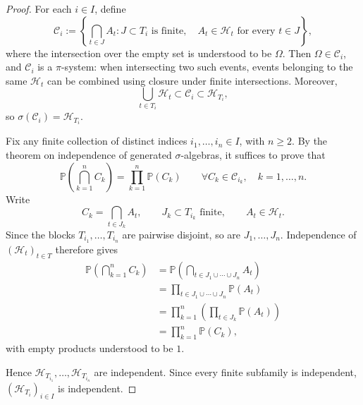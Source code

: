 \documentclass[11pt, a4paper, openany]{book}
\theoremstyle{definition}
\begin{document}
    \begin{proof}
        For each $i\in I$, define
        \[
            \mathscr{C}_i
            :=
            \left\{
                \bigcap_{t\in J}A_t:
                J\subset T_i \text{ is finite},
                \quad A_t\in\mathscr{H}_t \text{ for every }t\in J
            \right\},
        \]
        where the intersection over the empty set is understood
        to be $\Omega$.
        Then $\Omega\in\mathscr{C}_i$, and $\mathscr{C}_i$ is a
        $\pi$-system: when intersecting two such events, events
        belonging to the same $\mathscr{H}_t$ can be combined
        using closure under finite intersections.
        Moreover,
        \[
            \bigcup_{t\in T_i}\mathscr{H}_t
            \subset \mathscr{C}_i
            \subset \mathscr{H}_{T_i},
        \]
        so $\sigma(\mathscr{C}_i)=\mathscr{H}_{T_i}$.
    
        Fix any finite collection of distinct indices
        $i_1,\dots,i_n\in I$, with $n\geqslant2$.
        By the theorem on independence of generated
        $\sigma$-algebras, it suffices to prove that
        \[
            \mathbb{P}\left(\bigcap_{k=1}^n C_k\right)
            =
            \prod_{k=1}^n\mathbb{P}(C_k)
            \qquad
            \forall C_k\in\mathscr{C}_{i_k},\quad k=1,\dots,n.
        \]
        Write
        \[
            C_k=\bigcap_{t\in J_k}A_t,
            \qquad
            J_k\subset T_{i_k}\text{ finite},
            \qquad
            A_t\in\mathscr{H}_t.
        \]
        Since the blocks $T_{i_1},\dots,T_{i_n}$ are pairwise
        disjoint, so are $J_1,\dots,J_n$.
        Independence of $(\mathscr{H}_t)_{t\in T}$ therefore gives
        \begin{align*}
            \mathbb{P}\left(\bigcap_{k=1}^n C_k\right)
            &=
            \mathbb{P}\left(
                \bigcap_{t\in J_1\cup\cdots\cup J_n}A_t
            \right)\\
            &=
            \prod_{t\in J_1\cup\cdots\cup J_n}\mathbb{P}(A_t)\\
            &=
            \prod_{k=1}^n
            \left(\prod_{t\in J_k}\mathbb{P}(A_t)\right)\\
            &=
            \prod_{k=1}^n\mathbb{P}(C_k),
        \end{align*}
        with empty products understood to be $1$.
    
        Hence $\mathscr{H}_{T_{i_1}},\dots,\mathscr{H}_{T_{i_n}}$
        are independent.
        Since every finite subfamily is independent,
        $(\mathscr{H}_{T_i})_{i\in I}$ is independent.
    \end{proof}
\end{document}
